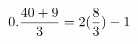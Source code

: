 \documentclass[preview]{standalone}
\begin{document}
\begin{align*}
\special{dvisvgm:raw <g id='unique000'>}0.\frac{40 + 9}{3} = 2(\frac{8}{3})-1\special{dvisvgm:raw </g>}
\end{align*}
\end{document}
